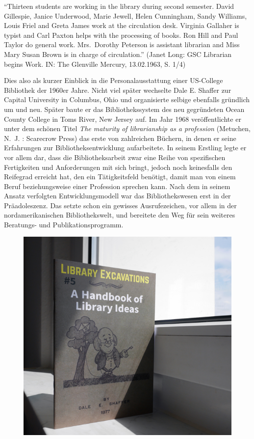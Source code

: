 \documentclass[a4paper,
fontsize=11pt,
oneside,
numbers=noperiodatend,
parskip=half-,
bibliography=totoc,
final
]{scrartcl}
\begin{document}
\enquote{Thirteen students are working in the library during second
semester. David Gillespie, Janice Underwood, Marie Jewell, Helen
Cunningham, Sandy Williams, Louis Friel and Greta James work at the
circulation desk. Virginia Gallaher is typist and Carl Paxton helps with
the processing of books. Ron Hill and Paul Taylor do general work.
Mrs.~Dorothy Peterson is assistant librarian and Miss Mary Susan Brown
is in charge of circulation.} (Janet Long: GSC Librarian begins Work.
IN: The Glenville Mercury, 13.02.1963, S. 1/4)

Dies also als kurzer Einblick in die Personalausstattung einer
US-College Bibliothek der 1960er Jahre. Nicht viel später wechselte Dale
E. Shaffer zur Capital University in Columbus, Ohio und organisierte
selbige ebenfalls gründlich um und neu. Später baute er das
Bibliothekssystem des neu gegründeten Ocean County College in Toms
River, New Jersey auf. Im Jahr 1968 veröffentlichte er unter dem schönen
Titel \emph{The maturity of librarianship as a profession} (Metuchen,
N.~J. : Scarecrow Press) das erste von zahlreichen Büchern, in denen er
seine Erfahrungen zur Bibliotheksentwicklung aufarbeitete. In seinem
Erstling legte er vor allem dar, dass die Bibliotheksarbeit zwar eine
Reihe von spezifischen Fertigkeiten und Anforderungen mit sich bringt,
jedoch noch keinesfalls den Reifegrad erreicht hat, den ein
Tätigkeitsfeld benötigt, damit man von einem Beruf beziehungsweise einer
Profession sprechen kann. Nach dem in seinem Ansatz verfolgten
Entwicklungsmodell war das Bibliothekswesen erst in der Präadoleszenz.
Das setzte schon ein gewisses Ausrufezeichen, vor allem in der
nordamerikanischen Bibliothekswelt, und bereitete den Weg für sein
weiteres Beratungs- und Publikationsprogramm.

\begin{figure}
\centering
\includegraphics{lib_excavations.png}
\end{figure}
\end{document}
